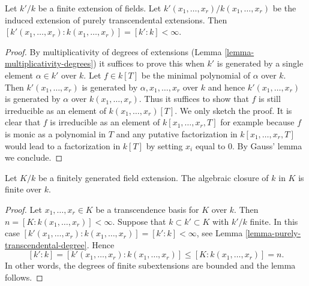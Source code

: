 \begin{lemma}
\label{lemma-purely-transcendental-degree}
Let $k'/k$ be a finite extension of fields. Let
$k'(x_1, \ldots, x_r)/k(x_1, \ldots, x_r)$ be the
induced extension of purely transcendental extensions.
Then $[k'(x_1, \ldots, x_r) : k(x_1, \ldots, x_r)] = [k' : k] < \infty$.
\end{lemma}

\begin{proof}
By multiplicativity of degrees of extensions
(Lemma \ref{lemma-multiplicativity-degrees})
it suffices to prove this when $k'$ is generated by a single element
$\alpha \in k'$ over $k$. Let $f \in k[T]$ be the minimal polynomial
of $\alpha$ over $k$. Then $k'(x_1, \ldots, x_r)$ is generated
by $\alpha, x_1, \ldots, x_r$ over $k$ and hence $k'(x_1, \ldots, x_r)$
is generated by $\alpha$ over $k(x_1, \ldots, x_r)$.
Thus it suffices to show that $f$ is still irreducible as
an element of $k(x_1, \ldots, x_r)[T]$. We only sketch the proof.
It is clear that $f$ is irreducible as an element of
$k[x_1, \ldots, x_r, T]$ for example because $f$ is monic
as a polynomial in $T$ and any putative factorization in
$k[x_1, \ldots, x_r, T]$ would lead to a factorization in $k[T]$
by setting $x_i$ equal to $0$. By Gauss' lemma we conclude.
\end{proof}

\begin{lemma}
\label{lemma-algebraic-closure-in-finitely-generated}
Let $K/k$ be a finitely generated field extension.
The algebraic closure of $k$ in $K$ is finite over $k$.
\end{lemma}

\begin{proof}
Let $x_1, \ldots, x_r \in K$ be a transcendence basis for $K$
over $k$. Then $n = [K : k(x_1, \ldots, x_r)] < \infty$.
Suppose that $k \subset k' \subset K$ with $k'/k$ finite.
In this case
$[k'(x_1, \ldots, x_r) : k(x_1, \ldots, x_r)] = [k' : k] < \infty$, see
Lemma \ref{lemma-purely-transcendental-degree}.
Hence
$$
[k' : k] = [k'(x_1, \ldots, x_r) : k(x_1, \ldots, x_r)] \leq
[K : k(x_1, \ldots, x_r)] = n.
$$
In other words, the degrees of finite subextensions are bounded
and the lemma follows.
\end{proof}






